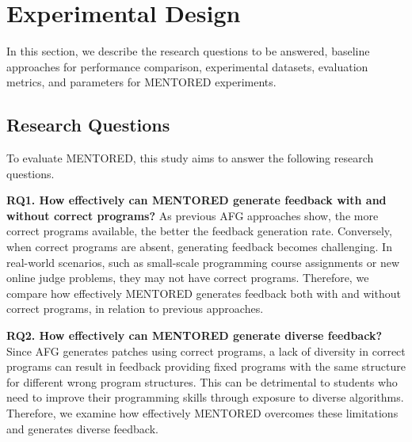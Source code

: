 \documentclass[10pt,conference]{IEEEtran}
\begin{document}
\section{Experimental Design}
    In this section, we describe the research questions to be answered, baseline approaches for performance comparison, experimental datasets, evaluation metrics, and parameters for MENTORED experiments.


    \subsection{Research Questions}
        To evaluate MENTORED, this study aims to answer the following research questions.

        \textbf{RQ1. How effectively can MENTORED generate feedback with and without correct programs?}
        As previous AFG approaches show, the more correct programs available, the better the feedback generation rate\cite{li2022generating, heo2023referent}. Conversely, when correct programs are absent, generating feedback becomes challenging. In real-world scenarios, such as small-scale programming course assignments or new online judge problems, they may not have correct programs. Therefore, we compare how effectively MENTORED generates feedback both with and without correct programs, in relation to previous approaches.

        \textbf{RQ2. How effectively can MENTORED generate diverse feedback?}
        Since AFG generates patches using correct programs, a lack of diversity in correct programs can result in feedback providing fixed programs with the same structure for different wrong program structures. This can be detrimental to students who need to improve their programming skills through exposure to diverse algorithms. Therefore, we examine how effectively MENTORED overcomes these limitations and generates diverse feedback.
\end{document}
